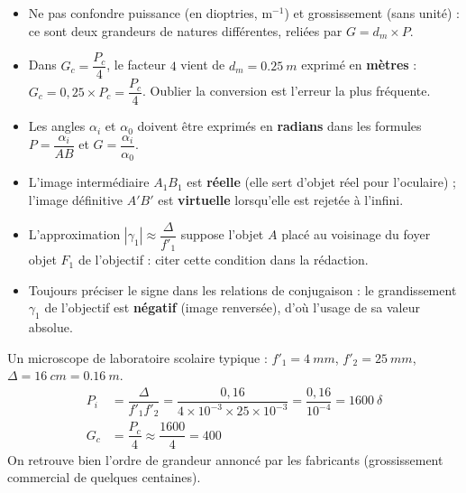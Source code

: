 \documentclass[11pt]{article}
\newcommand{\cle}[1]{{\popxbold\color{popdark}#1}}
\begin{document}
\begin{attention}
\begin{itemize}
  \item Ne pas confondre \cle{puissance} (en dioptries, $\text{m}^{-1}$) et \cle{grossissement} (sans unit\'e) : ce sont deux grandeurs de natures diff\'erentes, reli\'ees par $G = d_m \times P$.
  \item Dans $G_c = \dfrac{P_c}{4}$, le facteur $4$ vient de $d_m = \SI{0,25}{m}$ exprim\'e en \textbf{m\`etres} : $G_c = 0,25 \times P_c = \dfrac{P_c}{4}$. Oublier la conversion est l'erreur la plus fr\'equente.
  \item Les angles $\alpha_i$ et $\alpha_0$ doivent \^etre exprim\'es en \textbf{radians} dans les formules $P = \dfrac{\alpha_i}{AB}$ et $G = \dfrac{\alpha_i}{\alpha_0}$.
  \item L'image interm\'ediaire $A_1B_1$ est \textbf{r\'eelle} (elle sert d'objet r\'eel pour l'oculaire) ; l'image d\'efinitive $A'B'$ est \textbf{virtuelle} lorsqu'elle est rejet\'ee \`a l'infini.
  \item L'approximation $|\gamma_1| \approx \dfrac{\Delta}{f'_1}$ suppose l'objet $A$ plac\'e au voisinage du foyer objet $F_1$ de l'objectif : citer cette condition dans la r\'edaction.
  \item Toujours pr\'eciser le signe dans les relations de conjugaison : le grandissement $\gamma_1$ de l'objectif est \textbf{n\'egatif} (image renvers\'ee), d'o\`u l'usage de sa valeur absolue.
\end{itemize}
\end{attention}

\begin{exemplebox}
Un microscope de laboratoire scolaire typique : $f'_1 = \SI{4}{mm}$, $f'_2 = \SI{25}{mm}$, $\Delta = \SI{16}{cm} = \SI{0,16}{m}$.
\begin{align*}
P_i &= \dfrac{\Delta}{f'_1 f'_2} = \dfrac{0,16}{4\times 10^{-3} \times 25\times 10^{-3}} = \dfrac{0,16}{10^{-4}} = \SI{1600}{\delta} \\
G_c &= \dfrac{P_c}{4} \approx \dfrac{1600}{4} = 400
\end{align*}
On retrouve bien l'ordre de grandeur annonc\'e par les fabricants (grossissement commercial de quelques centaines).
\end{exemplebox}
\end{document}

